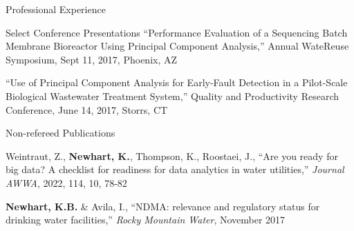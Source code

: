 \documentclass{resume} %
\begin{document}
\begin{rSection}{Professional Experience}
\begin{rSection}{Select Conference Presentations}
%
%
%
%
“Performance Evaluation of a Sequencing Batch Membrane Bioreactor Using Principal Component Analysis,” Annual WateReuse Symposium, Sept 11, 2017, Phoenix, AZ

“Use of Principal Component Analysis for Early-Fault Detection in a Pilot-Scale Biological Wastewater Treatment System,” Quality and Productivity Research Conference, June 14, 2017, Storrs, CT

%
%
\end{rSection}



\begin{rSection}{Non-refereed Publications}

Weintraut, Z., \textbf{Newhart, K.}, Thompson, K., Roostaei, J., ``Are you ready for big data? A checklist for readiness for data analytics in water utilities,'' \emph{Journal AWWA}, 2022, 114, 10, 78-82

\textbf{Newhart, K.B.} \& Avila, I., ``NDMA: relevance and regulatory status for drinking water facilities,'' \emph{Rocky Mountain Water}, November 2017

\end{rSection}



\end{rSection}
\end{document}
